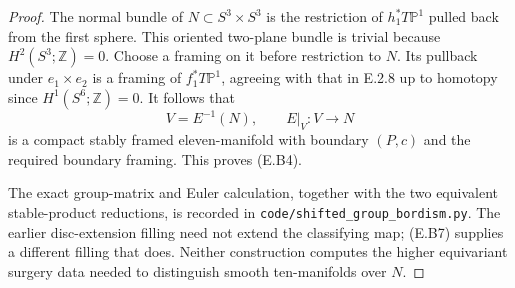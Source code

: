 \begin{proof}
The normal bundle of $N\subset S^3\times S^3$ is the
restriction of $h_1^*T\mathbb P^1$ pulled back from the first
sphere. This oriented two-plane bundle is trivial because
$H^2(S^3;\mathbb Z)=0$. Choose a framing on it before
restriction to $N$. Its pullback under $e_1\times e_2$
is a framing of $f_1^*T\mathbb P^1$, agreeing with that
in E.2.8 up to homotopy since $H^1(S^6;\mathbb Z)=0$.
It follows that
\[
                  V=E^{-1}(N),\qquad E|_V:V\longrightarrow N
\]
is a compact stably framed eleven-manifold with boundary
$(P,c)$ and the required boundary framing. This proves (E.B4).

The exact group-matrix and Euler calculation, together with
the two equivalent stable-product reductions, is recorded in
\texttt{code/shifted\_group\_bordism.py}.
The earlier disc-extension filling need not extend the
classifying map; (E.B7) supplies a different filling that does.
Neither construction computes the higher equivariant surgery
data needed to distinguish smooth ten-manifolds over $N$.
\end{proof}
